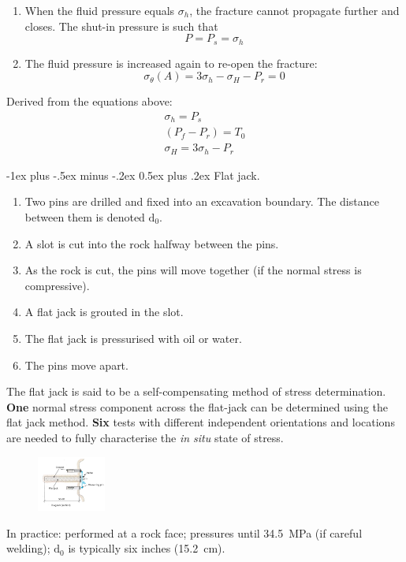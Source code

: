 \documentclass[10pt,landscape,a4paper]{article}
\makeatletter
\renewcommand{\section}{\@startsection{section}{1}{0mm}%
	{-1ex plus -.5ex minus -.2ex}%
	{0.5ex plus .2ex}%
	{\normalfont\large\bfseries}}
\makeatother
\begin{document}
\begin{multicols}{3}
\begin{enumerate}
		\item When the fluid pressure equals $\sigma_h$, the fracture cannot propagate further and closes. The shut-in pressure is such that
		      \[
			      P=P_s=\sigma_h
		      \]
		\item The fluid pressure is increased again to re-open the fracture:
		      \[
			      \sigma_\theta(A)=3\sigma_h-\sigma_H-P_r=0
		      \]
	\end{enumerate}
	Derived from the equations above:
	\begin{align*}
		\sigma_h=P_s  \\
		(P_f-P_r)=T_0 \\
		\sigma_H=3\sigma_h-P_r
	\end{align*}
	
	\section{Flat jack.}
	\begin{enumerate}
		\item Two pins are drilled and fixed into an excavation boundary. The distance between them is denoted $\text{d}_0$.
		\item A slot is cut into the rock halfway between the pins.
		\item As the rock is cut, the pins will move together (if the normal stress is compressive).
		\item A flat jack is grouted in the slot.
		\item The flat jack is pressurised with oil or water.
		\item The pins move apart.
	\end{enumerate}
	The flat jack is said to be a self-compensating method of stress determination.
	\textbf{One} normal stress component across the flat-jack can be determined using the flat jack method.
	\textbf{Six} tests with different independent orientations and locations are needed to fully characterise the \textit{in situ} state of stress.
	\begin{figure}[H]
		\centering
		\includegraphics[width=0.2\textwidth]{flat-jack}
	\end{figure}
	In practice: performed at a rock face; pressures until \SI{34.5}{\mega\pascal} (if careful welding); $\text{d}_0$ is typically six inches (\SI{15.2}{\centi\meter}).
	

\end{multicols}
\end{document}
